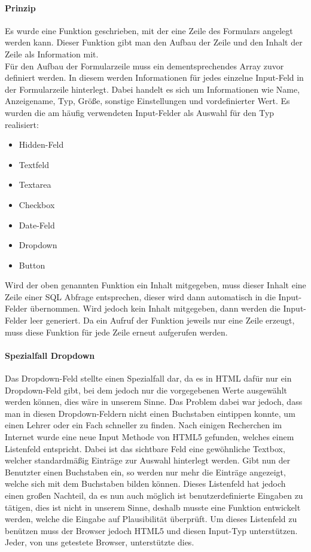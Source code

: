 \paragraph{Prinzip}
Es wurde eine Funktion geschrieben, mit der eine Zeile des Formulars angelegt werden kann. Dieser Funktion gibt man den Aufbau der Zeile und den Inhalt der Zeile als Information mit.\\
Für den Aufbau der Formularzeile muss ein dementsprechendes Array zuvor definiert werden. In diesem werden Informationen für jedes einzelne Input-Feld in der Formularzeile hinterlegt. Dabei handelt es sich um Informationen wie Name, Anzeigename, Typ, Größe, sonstige Einstellungen und vordefinierter Wert. Es wurden die am häufig verwendeten  Input-Felder als Auswahl für den Typ realisiert:
\begin{itemize}
	\item Hidden-Feld
	\item Textfeld
	\item Textarea
	\item Checkbox
	\item Date-Feld
	\item Dropdown
	\item Button
\end{itemize}
Wird der oben genannten Funktion ein Inhalt mitgegeben, muss dieser Inhalt eine Zeile einer SQL Abfrage entsprechen, dieser wird dann automatisch in die Input-Felder übernommen. Wird jedoch kein Inhalt mitgegeben, dann werden die Input-Felder leer generiert. Da ein Aufruf der Funktion jeweils nur eine Zeile erzeugt, muss diese Funktion für jede Zeile erneut aufgerufen werden.
\paragraph{Spezialfall Dropdown}
Das Dropdown-Feld stellte einen Spezialfall dar, da es in HTML dafür nur ein Dropdown-Feld gibt, bei dem jedoch nur die vorgegebenen Werte ausgewählt werden können, dies wäre in unserem Sinne. Das Problem dabei war jedoch, dass man in diesen Dropdown-Feldern nicht einen Buchstaben eintippen konnte, um einen Lehrer oder ein Fach schneller zu finden. Nach einigen Recherchen im Internet wurde eine neue Input Methode von HTML5 gefunden, welches einem Listenfeld entspricht. Dabei ist das sichtbare Feld eine gewöhnliche Textbox, welcher standardmäßig Einträge zur Auswahl hinterlegt werden. Gibt nun der Benutzter einen Buchstaben ein, so werden nur mehr die Einträge angezeigt, welche sich mit dem Buchstaben bilden können. Dieses Listenfeld hat jedoch einen großen Nachteil, da es nun auch möglich ist benutzerdefinierte Eingaben zu tätigen, dies ist nicht in unserem Sinne, deshalb musste eine Funktion entwickelt werden, welche die Eingabe auf Plausibilität überprüft. Um dieses Listenfeld zu benützen muss der Browser jedoch HTML5 und diesen Input-Typ unterstützen. Jeder, von uns getestete Browser, unterstützte dies.

